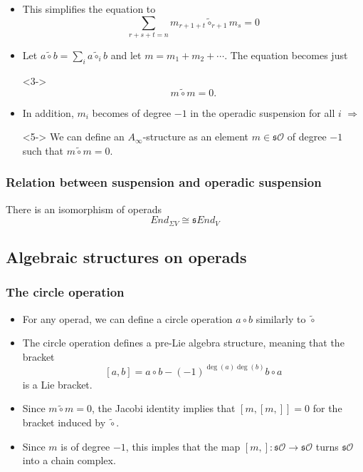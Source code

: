\documentclass{beamer}
\theoremstyle{definition}
\begin{document}
\begin{frame}
\begin{itemize}
\item<1-> This simplifies the equation to
\[\sum_{r+s+t=n}m_{r+1+t}\tilde{\circ}_{r+1}m_s=0\] %
\item<2-> Let $a\tilde{\circ}b=\sum_{i}a\tilde{\circ}_ib$ and let $m=m_1+m_2+\cdots$. The equation becomes just
\item[]<3-> \[m\tilde{\circ}m=0.\]
\item<4-> In addition, $m_i$ becomes of degree $-1$ in the operadic suspension for all $i$ $\Rightarrow$
\item[]<5-> We can define an $A_\infty$-structure as an element $m\in\mathfrak{s}\mathcal{O}$ of degree $-1$ such that $m\tilde{\circ}m=0$. 
\end{itemize}
\end{frame}
\begin{frame}
\frametitle{Relation between suspension and operadic suspension}
\begin{theorem}[Markl]
There is an isomorphism of operads
\[End_{\Sigma V}\cong \mathfrak{s}End_V\]
\end{theorem}
\end{frame}
\subsection{Algebraic structures on operads}
\begin{frame}
\frametitle{The circle operation}
\begin{itemize}
\item<1-> For any operad, we can define a circle operation $a\circ b$ similarly to $\tilde{\circ}$ %
\item The circle operation defines a pre-Lie algebra structure, meaning that the bracket
\[[a,b]=a\circ b-(-1)^{\deg(a)\deg(b)}b\circ a\]
is a Lie bracket.
\end{itemize}
\end{frame}

\begin{frame}
\begin{itemize}
\item<1-> Since $m\tilde{\circ}m=0$, the Jacobi identity implies that $[m,[m,]]=0$ for the bracket induced by $\tilde{\circ}$.
\item<2-> Since $m$ is of degree $-1$, this imples that the map $[m,]:\mathfrak{s}\mathcal{O}\to\mathfrak{s}\mathcal{O}$ turns $\mathfrak{s}\mathcal{O}$ into a chain complex.
\end{itemize}
\end{frame}
\end{document}
